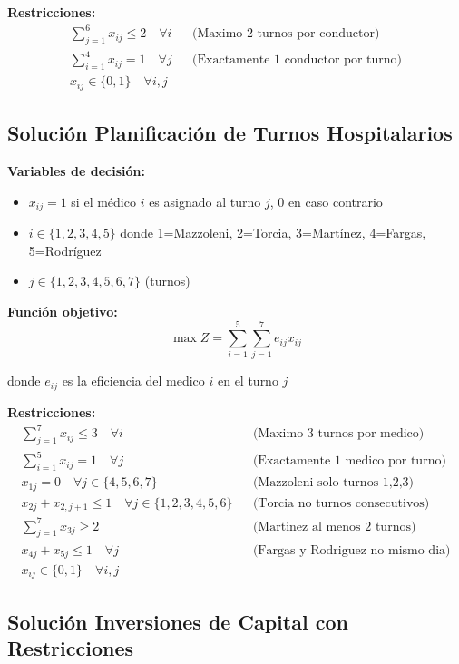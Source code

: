 \documentclass[12pt]{article}
\begin{document}
\textbf{Restricciones:}
\begin{align*}
    \sum_{j=1}^{6} x_{ij} \leq 2 \quad \forall i && \text{(Maximo 2 turnos por conductor)} \\
    \sum_{i=1}^{4} x_{ij} = 1 \quad \forall j && \text{(Exactamente 1 conductor por turno)} \\
    x_{ij} \in \{0,1\} \quad \forall i,j
\end{align*}

\subsection{Solución Planificación de Turnos Hospitalarios}

\textbf{Variables de decisión:}
\begin{itemize}
    \item $x_{ij} = 1$ si el médico $i$ es asignado al turno $j$, 0 en caso contrario
    \item $i \in \{1, 2, 3, 4, 5\}$ donde 1=Mazzoleni, 2=Torcia, 3=Martínez, 4=Fargas, 5=Rodríguez
    \item $j \in \{1, 2, 3, 4, 5, 6, 7\}$ (turnos)
\end{itemize}

\textbf{Función objetivo:}
$$\max Z = \sum_{i=1}^{5} \sum_{j=1}^{7} e_{ij} x_{ij}$$
\begin{center}
donde $e_{ij}$ es la eficiencia del medico $i$ en el turno $j$
\end{center}

\textbf{Restricciones:}
\begin{align*}
    \sum_{j=1}^{7} x_{ij} \leq 3 \quad \forall i && \text{(Maximo 3 turnos por medico)} \\
    \sum_{i=1}^{5} x_{ij} = 1 \quad \forall j && \text{(Exactamente 1 medico por turno)} \\
    x_{1j} = 0 \quad \forall j \in \{4,5,6,7\} && \text{(Mazzoleni solo turnos 1,2,3)} \\
    x_{2j} + x_{2,j+1} \leq 1 \quad \forall j \in \{1,2,3,4,5,6\} && \text{(Torcia no turnos consecutivos)} \\
    \sum_{j=1}^{7} x_{3j} \geq 2 && \text{(Martinez al menos 2 turnos)} \\
    x_{4j} + x_{5j} \leq 1 \quad \forall j && \text{(Fargas y Rodriguez no mismo dia)} \\
    x_{ij} \in \{0,1\} \quad \forall i,j
\end{align*}

\subsection{Solución Inversiones de Capital con Restricciones}
\end{document}

